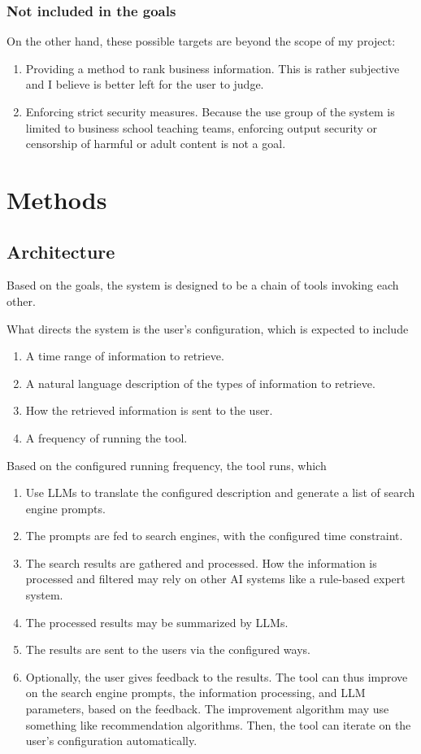 \documentclass[final-report]{report-template}
\begin{document}
\subsubsection{Not included in the goals}
On the other hand, these possible targets are beyond the scope of my project:
\begin{enumerate}
	\item Providing a method to rank business information. This is rather
		subjective and I believe is better left for the user to judge.
	\item Enforcing strict security measures. Because the use group of the
		system is limited to business school teaching teams, enforcing output
		security or censorship of harmful or adult content is not a goal.
\end{enumerate}

\section{Methods} 
\subsection{Architecture}
Based on the goals, the system is designed to be a chain of tools invoking each
other.

What directs the system is the user's configuration, which is expected to
include
\begin{enumerate}
	\item A time range of information to retrieve.
	\item A natural language description of the types of information to
		retrieve.
	\item How the retrieved information is sent to the user.
	\item A frequency of running the tool.
\end{enumerate}

Based on the configured running frequency, the tool runs, which
\begin{enumerate}
	\item Use LLMs to translate the configured description and generate a list
		of search engine prompts.
	\item The prompts are fed to search engines, with the configured time
		constraint.
	\item The search results are gathered and processed. How the information is
		processed and filtered may rely on other AI systems like a
		rule-based expert system.
	\item The processed results may be summarized by LLMs.
	\item The results are sent to the users via the configured ways.
	\item Optionally, the user gives feedback to the results. The tool can
		thus improve on the search engine prompts, the information processing,
		and LLM parameters, based on the feedback. The improvement algorithm
		may use something like recommendation algorithms. Then, the tool can
		iterate on the user's configuration automatically.
\end{enumerate}
\end{document}
